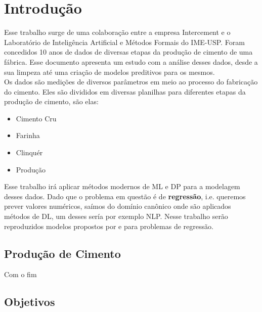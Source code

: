 \chapter{Introdução}
\label{cap:introducao}


Esse trabalho surge de uma colaboração entre a empresa Intercement e o Laboratório de Inteligência Artificial e Métodos Formais do IME-USP. Foram concedidos 10 anos de dados de diversas etapas da produção de cimento de uma fábrica. Esse documento apresenta um estudo com a análise desses dados, desde a sua limpeza até uma criação de modelos preditivos para os mesmos. \\

Os dados são medições de diversos parâmetros em meio ao processo do fabricação do cimento. Eles são divididos em diversas planilhas para diferentes etapas da produção de cimento, são elas:

\begin{itemize}
        \item Cimento Cru
        \item Farinha
        \item Clinquér
        \item Produção
\end{itemize}


Esse trabalho irá aplicar métodos modernos de ML e DP para a modelagem desses dados. Dado que o problema em questão é de \textbf{regressão}, i.e. queremos prever valores numéricos, saímos do domínio canônico onde são aplicados métodos de DL, um desses sería por exemplo NLP. Nesse trabalho serão reproduzidos modelos propostos por \citet{ubertime} e \citet{energylstm} para problemas de regressão.



\section{Produção de Cimento}
\label{sec:producao}

Com o fim  

\section{Objetivos}
\label{sec:objetivo}

